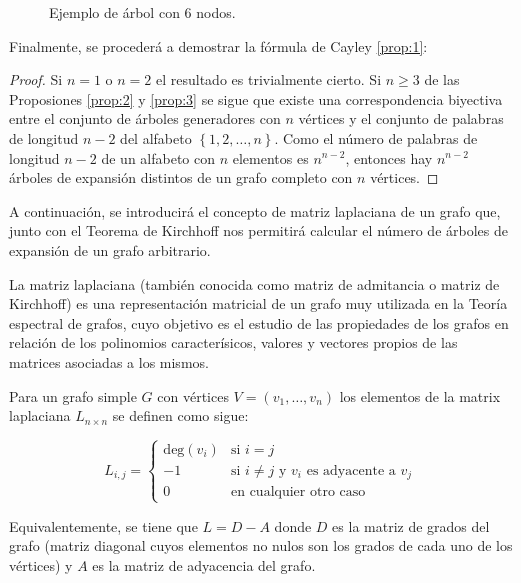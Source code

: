 \begin{figure}[H]
\centering
{}
\caption{Ejemplo de árbol con $6$ nodos.}
\label{fig:arbol2}
\end{figure}

Finalmente, se procederá a demostrar la fórmula de Cayley \ref{prop:1}:
\begin{proof}
Si $n = 1$ o $n = 2$ el resultado es trivialmente cierto. Si $n \geq 3$ de las Proposiones \ref{prop:2} y \ref{prop:3} se sigue que existe una correspondencia biyectiva entre el conjunto de árboles generadores con $n$ vértices y el conjunto de palabras de longitud $n-2$ del alfabeto $\left\lbrace 1,2,\dots,n \right\rbrace$. Como el número de palabras de longitud $n-2$ de un alfabeto con $n$ elementos es $n^{n-2}$, entonces hay $n^{n-2}$ árboles de expansión distintos de un grafo completo con $n$ vértices.
\end{proof}

A continuación, se introducirá el concepto de matriz laplaciana de un grafo que, junto con el Teorema de Kirchhoff nos permitirá calcular el número de árboles de expansión de un grafo arbitrario.

\begin{definition}
La matriz laplaciana (también conocida como matriz de admitancia o matriz de Kirchhoff) es una representación matricial de un grafo muy utilizada en la Teoría espectral de grafos, cuyo objetivo es el estudio de las propiedades de los grafos en relación de los polinomios caracterísicos, valores y vectores propios de las matrices asociadas a los mismos.

Para un grafo simple $G$ con vértices $V = (v_1,\dots,v_n)$ los elementos de la matrix laplaciana $L_{n\times n}$ se definen como sigue:

\begin{equation}
L_{i,j} = 
\begin{cases}
    \text{deg}(v_i) & \text{si } i=j \\
    -1 & \text{si } i\neq j \text{ y }v_i \text{ es adyacente a }v_j\\
    0 & \text{en cualquier otro caso}
\end{cases}
\end{equation}

Equivalentemente, se tiene que $L = D - A$ donde $D$ es la matriz de grados del grafo (matriz diagonal cuyos elementos no nulos son los grados de cada uno de los vértices) y $A$ es la matriz de adyacencia del grafo.
\end{definition}

